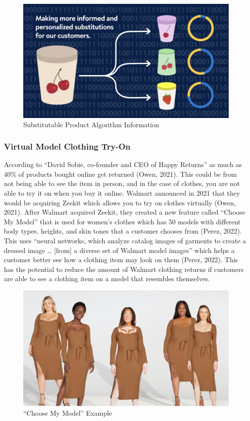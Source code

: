 \documentclass[
]{article}
\begin{document}
\begin{figure}
\centering
\includegraphics{Walmart-AI-Item-Substitution.png}
\caption{Substitutable Product Algorithm Information}
\end{figure}

\hypertarget{virtual-model-clothing-try-on}{%
\subsubsection{Virtual Model Clothing Try-On}\label{virtual-model-clothing-try-on}}

According to ``David Sobie, co-founder and CEO of Happy Returns'' as much as 40\% of products bought online get returned (Owen, 2021). This could be from not being able to see the item in person, and in the case of clothes, you are not able to try it on when you buy it online. Walmart announced in 2021 that they would be acquiring Zeekit which allows you to try on clothes virtually (Owen, 2021). After Walmart acquired Zeekit, they created a new feature called ``Choose My Model'' that is used for women's clothes which has 50 models with different body types, heights, and skin tones that a customer chooses from (Perez, 2022). This uses ``neural networks, which analyze catalog images of garments to create a dressed image \ldots{} {[}from{]} a diverse set of Walmart model images'' which helps a customer better see how a clothing item may look on them (Perez, 2022). This has the potential to reduce the amount of Walmart clothing returns if customers are able to see a clothing item on a model that resembles themselves.

\begin{figure}
\centering
\includegraphics{ChooseMyModel.jpg}
\caption{``Choose My Model'' Example}
\end{figure}
\end{document}
